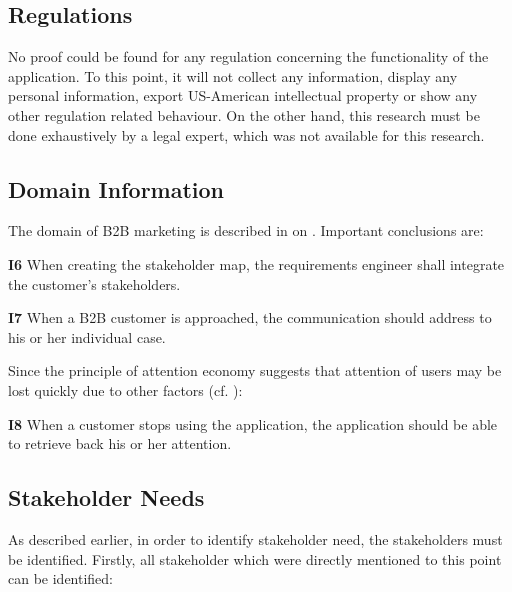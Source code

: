 \subsection{Regulations}
No proof could be found for any regulation concerning the functionality of the application. To this point, it will not collect any information, display any personal information, export US-American intellectual property or show any other regulation related behaviour. On the other hand, this research must be done exhaustively by a legal expert, which was not available for this research.

\subsection{Domain Information}
The domain of B2B marketing is described in  on . Important conclusions are: 

\begin{closeItem}
    \item [\textbf{I6}] When creating the stakeholder map, the requirements engineer shall integrate the customer's stakeholders.
    \item [\textbf{I7}] When a B2B customer is approached, the communication should address to his or her individual case.
\end{closeItem}

Since the principle of attention economy suggests that attention of users may be lost quickly due to other factors (cf. ):

\begin{closeItem}
    \item [\textbf{I8}] When a customer stops using the application, the application should be able to retrieve back his or her attention.
\end{closeItem}

\paragraph{}

\subsection{Stakeholder Needs}
As described earlier, in order to identify stakeholder need, the stakeholders must be identified. Firstly, all stakeholder which were directly mentioned to this point can be identified:

